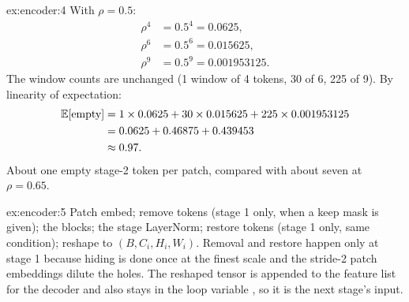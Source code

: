 \begin{solution}{ex:encoder:4}
With $\rho = 0.5$:
\begin{align*}
\rho^4 &= 0.5^4 = 0.0625,\\
\rho^6 &= 0.5^6 = 0.015625,\\
\rho^9 &= 0.5^9 = 0.001953125.
\end{align*}
The window counts are unchanged (1 window of 4 tokens, 30 of 6, 225 of 9). By linearity of expectation:
\begin{align*}
\mathbb{E}[\text{empty}] &= 1 \times 0.0625 + 30 \times 0.015625 + 225 \times 0.001953125\\
&= 0.0625 + 0.46875 + 0.439453\\
&\approx 0.97 .
\end{align*}
About one empty stage-2 token per patch, compared with about seven at $\rho = 0.65$.
\end{solution}

\begin{solution}{ex:encoder:5}
Patch embed; remove tokens (stage 1 only, when a keep mask is given); the blocks; the stage LayerNorm;
restore tokens (stage 1 only, same condition); reshape to $(B, C_i, H_i, W_i)$. Removal and
restore happen only at stage 1 because hiding is done once at the finest scale and the stride-2 patch
embeddings dilute the holes. The reshaped tensor is appended to the feature list for the decoder and
also stays in the loop variable , so it is the next stage's input.
\end{solution}
